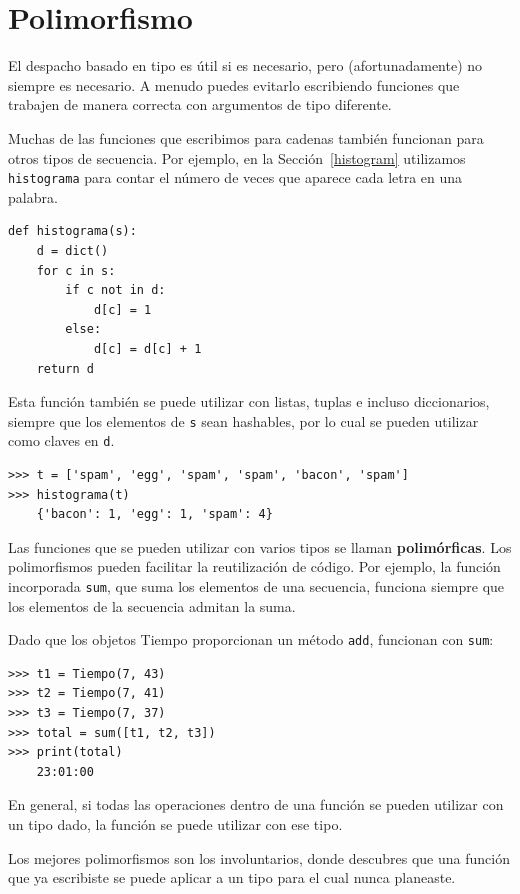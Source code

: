 \documentclass[10pt]{book}
\begin{document}
\section{Polimorfismo}
\label{polymorphism}

El despacho basado en tipo es útil si es necesario, pero (afortunadamente)
no siempre es necesario.  A menudo puedes evitarlo escribiendo funciones
que trabajen de manera correcta con argumentos de tipo diferente.

Muchas de las funciones que escribimos para cadenas también
funcionan para otros tipos de secuencia.
Por ejemplo, en la Sección~\ref{histogram}
utilizamos {\tt histograma} para contar el número de veces que aparece cada letra
en una palabra.

\begin{verbatim}
def histograma(s):
    d = dict()
    for c in s:
        if c not in d:
            d[c] = 1
        else:
            d[c] = d[c] + 1
    return d
\end{verbatim}
%
Esta función también se puede utilizar con listas, tuplas e incluso diccionarios,
siempre que los elementos de {\tt s} sean hashables, por lo cual se pueden utilizar
como claves en {\tt d}.

\begin{verbatim}
>>> t = ['spam', 'egg', 'spam', 'spam', 'bacon', 'spam']
>>> histograma(t)
    {'bacon': 1, 'egg': 1, 'spam': 4}
\end{verbatim}
%
Las funciones que se pueden utilizar con varios tipos se llaman {\bf polimórficas}.
Los polimorfismos pueden facilitar la reutilización de código.  Por ejemplo, la función
incorporada {\tt sum}, que suma los elementos de una secuencia, funciona
siempre que los elementos de la secuencia admitan la suma.

Dado que los objetos Tiempo proporcionan un método {\tt add}, funcionan
con {\tt sum}:

\begin{verbatim}
>>> t1 = Tiempo(7, 43)
>>> t2 = Tiempo(7, 41)
>>> t3 = Tiempo(7, 37)
>>> total = sum([t1, t2, t3])
>>> print(total)
    23:01:00
\end{verbatim}
%
En general, si todas las operaciones dentro de una función
se pueden utilizar con un tipo dado, la función se puede utilizar con ese tipo.

Los mejores polimorfismos son los involuntarios, donde
descubres que una función que ya escribiste se puede
aplicar a un tipo para el cual nunca planeaste.
\end{document}
